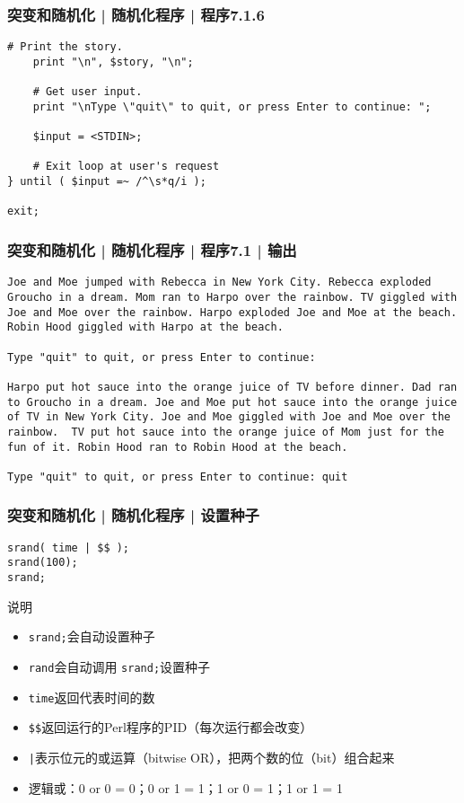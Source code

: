 \begin{frame}[fragile]
  \frametitle{突变和随机化 | 随机化程序 | 程序7.1.6}
\begin{lstlisting}[firstnumber=68]
    # Print the story.
    print "\n", $story, "\n";

    # Get user input.
    print "\nType \"quit\" to quit, or press Enter to continue: ";

    $input = <STDIN>;

    # Exit loop at user's request
} until ( $input =~ /^\s*q/i );

exit;
\end{lstlisting}
\end{frame}

\begin{frame}[fragile]
  \frametitle{突变和随机化 | 随机化程序 | 程序7.1 | 输出}
\begin{lstlisting}[basicstyle=\footnotesize\tt]
Joe and Moe jumped with Rebecca in New York City. Rebecca exploded Groucho in a dream. Mom ran to Harpo over the rainbow. TV giggled with Joe and Moe over the rainbow. Harpo exploded Joe and Moe at the beach. Robin Hood giggled with Harpo at the beach. 

Type "quit" to quit, or press Enter to continue: 

Harpo put hot sauce into the orange juice of TV before dinner. Dad ran to Groucho in a dream. Joe and Moe put hot sauce into the orange juice of TV in New York City. Joe and Moe giggled with Joe and Moe over the rainbow.  TV put hot sauce into the orange juice of Mom just for the fun of it. Robin Hood ran to Robin Hood at the beach. 

Type "quit" to quit, or press Enter to continue: quit
\end{lstlisting}
\end{frame}

\begin{frame}[fragile]
  \frametitle{突变和随机化 | 随机化程序 | \alert{设置种子}}
\begin{lstlisting}
srand( time | $$ );
srand(100);
srand;
\end{lstlisting}
\begin{block}{说明}
  \begin{itemize}
    \item \verb|srand;|会自动设置种子
    \item \verb|rand|会自动调用 \verb|srand;|设置种子
    \item \verb|time|返回代表时间的数
    \item \verb|$$|返回运行的Perl程序的PID（每次运行都会改变）
    \item \verb=|=表示位元的或运算（bitwise OR），把两个数的位（bit）组合起来
    \item 逻辑或：0 or 0 = 0；0 or 1 = 1；1 or 0 = 1；1 or 1 = 1
  \end{itemize}
\end{block}
\end{frame}

